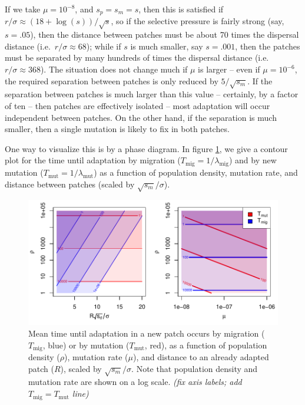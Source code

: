 \documentclass{article}
\newcommand{\migrate}{\lambda_\text{mig}}
\newcommand{\mutrate}{\lambda_\text{mut}}
\newcommand{\Tmig}{T_\text{mig}}
\newcommand{\Tmut}{T_\text{mut}}
\newcommand{\plr}[1]{{\it\color{blue}(#1)}}
\begin{document}
If we take $\mu = 10^{-8}$, and $s_p=s_m=s$, then this is satisfied if $r/\sigma \approx (18+\log(s))/\sqrt{s}$,
so if the selective pressure is fairly strong (say, $s=.05$),
then the distance between patches must be about 70 times the dispersal distance (i.e.\ $r/\sigma \approx 68$);
while if $s$ is much smaller, say $s = .001$, 
then the patches must be separated by many hundreds of times the dispersal distance (i.e.\ $r/\sigma \approx 368$).
The situation does not change much if $\mu$ is larger -- even if $\mu = 10^{-6}$, 
the required separation between patches is only reduced by $5/\sqrt{s_m}$.
If the separation between patches is much larger than this value -- certainly, by a factor of ten -- 
then patches are effectively isolated -- most adaptation will occur independent between patches.
On the other hand, if the separation is much smaller, then a single
mutation is likely to fix in both patches.

One way to visualize this is by a phase diagram.
In figure \ref{fig:phase_diagram},
we give a contour plot for the time until adaptation by migration ($\Tmig = 1/\migrate$) and by new mutation ($\Tmut=1/\mutrate$)
as a function of population density, mutation rate, and distance between patches (scaled by $\sqrt{s_m}/\sigma$).

\begin{figure}[ht]
  \begin{center}
    \includegraphics{phase-diagram-log}
  \end{center}
  \caption{
  Mean time until adaptation in a new patch occurs by migration ($\Tmig$, blue) or by mutation ($\Tmut$, red),
  as a function of population density ($\rho$), mutation rate ($\mu$), 
  and distance to an already adapted patch ($R$), scaled by $\sqrt{s_m}/\sigma$.
  Note that population density and mutation rate are shown on a log scale.
  \plr{fix axis labels; add $\Tmig=\Tmut$ line}
  \label{fig:phase_diagram}
  }
\end{figure}
\end{document}
